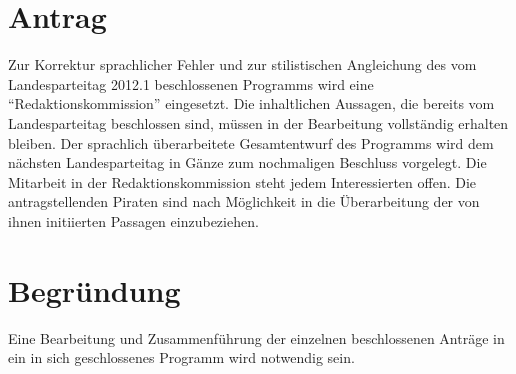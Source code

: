 \section{Antrag}

Zur Korrektur sprachlicher Fehler und zur stilistischen Angleichung des vom Landesparteitag 2012.1 beschlossenen Programms wird eine ``Redaktionskommission'' eingesetzt. Die inhaltlichen Aussagen, die bereits vom Landesparteitag beschlossen sind, müssen in der Bearbeitung vollständig erhalten bleiben. Der sprachlich überarbeitete Gesamtentwurf des Programms wird dem nächsten Landesparteitag in Gänze zum nochmaligen Beschluss vorgelegt. Die Mitarbeit in der Redaktionskommission steht jedem Interessierten offen. Die antragstellenden Piraten sind nach Möglichkeit in die Überarbeitung der von ihnen initiierten Passagen einzubeziehen.

\section{Begründung}

Eine Bearbeitung und Zusammenführung der einzelnen beschlossenen Anträge in ein in sich geschlossenes Programm wird notwendig sein.

